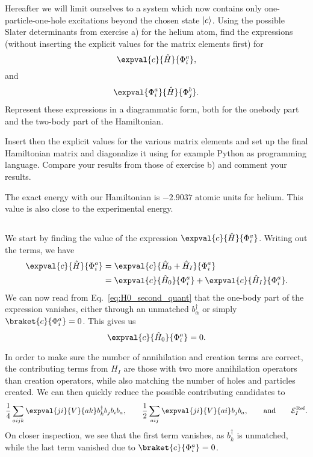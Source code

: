 Hereafter we will limit ourselves to a system which now contains only one-particle-one-hole excitations beyond the chosen state $\lvert c\rangle$.
Using the possible Slater determinants from exercise a) for the helium atom, find the expressions (without inserting the explicit values for the matrix elements first) for %
\begin{equation*}
    \expval{c}{\hat{H}}{\Phi_i^a},
\end{equation*}
and
\begin{equation*}
    \expval{\Phi_i^a}{\hat{H}}{\Phi_j^b}.
\end{equation*}
Represent these expressions in a diagrammatic form, both for the onebody part and the two-body part of the Hamiltonian.

Insert then the explicit values for the various matrix elements and set up the final Hamiltonian matrix and diagonalize it using for example Python as programming language.
Compare your results from those of exercise b) and comment your results. %

The exact energy with our Hamiltonian is $-2.9037$ atomic units for helium.
This value is also close to the experimental energy.

\subsection{}


\subsection{}
We start by finding the value of the expression $\expval{c}{\hat{H}}{\Phi_i^a}$.
Writing out the terms, we have
\begin{align*}
    \expval{c}{\hat{H}}{\Phi_i^a} &= \expval{c}{\hat{H}_0 + \hat{H}_I}{\Phi_i^a} \\
    &= \expval{c}{\hat{H}_0}{\Phi_i^a} + \expval{c}{\hat{H}_I}{\Phi_i^a}.
\end{align*}
We can now read from Eq.~\eqref{eq:H0_second_quant} that the one-body part of the expression vanishes, either through an unmatched $b_\alpha^\dagger$ or simply $\braket{c}{\Phi_i^a} = 0$.
This gives us
\begin{equation}\label{eq:1p1h-ground-onebody}
    \expval{c}{\hat{H}_0}{\Phi_i^a} = 0.
\end{equation}

In order to make sure the number of annihilation and creation terms are correct, the contributing terms from $H_I$ are those with two more annihilation operators than creation operators, while also matching the number of holes and particles created.
We can then quickly reduce the possible contributing candidates to
\begin{equation*}
    \frac{1}{4} \sum_{aijk} \expval{ji}{V}{ak} b_k^\dagger b_j b_i b_a, \qquad
    \frac{1}{2} \sum_{aij} \expval{ji}{V}{ai} b_j b_a, \qquad
    \text{and} \qquad \mathcal{E}_I^\text{Ref}.
\end{equation*}
On closer inspection, we see that the first term vanishes, as $b_k^\dagger$ is unmatched, while the last term vanished due to $\braket{c}{\Phi_i^a} = 0$.

